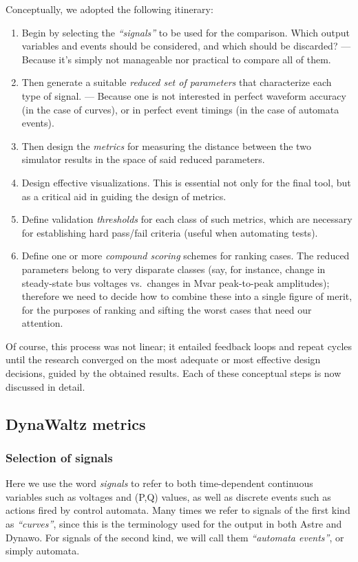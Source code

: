 \documentclass[conference]{IEEEtran}
\begin{document}
Conceptually, we adopted the following itinerary:
\begin{enumerate}
  \item Begin by selecting the \emph{``signals''} to be
    used for the comparison. Which output variables and events should
    be considered, and which should be discarded? --- Because it's simply
    not manageable nor practical to compare all of them.
  \item Then generate a suitable \emph{reduced set of parameters} that
    characterize each type of signal. ---  Because one is not interested
    in perfect waveform accuracy (in the case of curves), or in
    perfect event timings (in the case of automata events).
  \item Then design the \emph{metrics} for measuring the distance
    between the two simulator results in the space of said reduced
    parameters.
  \item Design effective visualizations. This is essential not only
    for the final tool, but as a critical aid in guiding the design of
    metrics.
  \item Define validation \emph{thresholds} for each class of such
    metrics, which are necessary for establishing hard pass/fail
    criteria (useful when automating tests).
  \item Define one or more \emph{compound scoring} schemes for ranking
    cases. The reduced parameters belong to very disparate classes
    (say, for instance, change in steady-state bus voltages
    vs.\ changes in Mvar peak-to-peak amplitudes); therefore we need
    to decide how to combine these into a single figure of merit, for
    the purposes of ranking and sifting the worst cases that need our
    attention.
\end{enumerate}
Of course, this process was not linear; it entailed feedback loops and
repeat cycles until the research converged on the most adequate or
most effective design decisions, guided by the obtained results.  Each
of these conceptual steps is now discussed in detail.



\subsection{DynaWaltz metrics}

\subsubsection{Selection of signals}
Here we use the word \emph{signals} to refer to both time-dependent continuous
variables such as voltages and (P,Q) values, as well as discrete events such as
actions fired by control automata.  Many times we refer to signals of the
first kind as \emph{``curves''}, since this is the terminology used for the
output in both Astre and Dynawo. For signals of the second kind, we will
call them \emph{``automata events''}, or simply automata.
\end{document}
